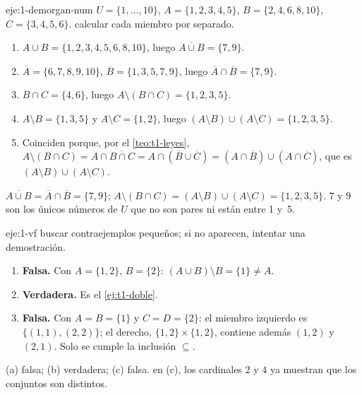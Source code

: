 \begin{solucion}{eje:1-demorgan-num}
\datos $U=\{1,\dots,10\}$, $A=\{1,2,3,4,5\}$, $B=\{2,4,6,8,10\}$, $C=\{3,4,5,6\}$.
\planteamiento calcular cada miembro por separado.
\pasos
\begin{enumerate}[label=\arabic*.]
  \item $A\cup B=\{1,2,3,4,5,6,8,10\}$, luego $\overline{A\cup B}=\{7,9\}$.
  \item $\overline{A}=\{6,7,8,9,10\}$, $\overline{B}=\{1,3,5,7,9\}$, luego $\overline{A}\cap\overline{B}=\{7,9\}$.
  \item $B\cap C=\{4,6\}$, luego $A\setminus(B\cap C)=\{1,2,3,5\}$.
  \item $A\setminus B=\{1,3,5\}$ y $A\setminus C=\{1,2\}$, luego $(A\setminus B)\cup(A\setminus C)=\{1,2,3,5\}$.
  \item Coinciden porque, por el \cref{teo:t1-leyes}, $A\setminus(B\cap C)=A\cap\overline{B\cap C}=A\cap(\overline{B}\cup\overline{C})=(A\cap\overline{B})\cup(A\cap\overline{C})$, que es $(A\setminus B)\cup(A\setminus C)$.
\end{enumerate}
\resultado $\overline{A\cup B}=\overline{A}\cap\overline{B}=\{7,9\}$; $A\setminus(B\cap C)=(A\setminus B)\cup(A\setminus C)=\{1,2,3,5\}$.
\comprobacion $7$ y $9$ son los únicos números de $U$ que no son pares ni están entre 1 y~5.
\end{solucion}

\begin{solucion}{eje:1-vf}
\planteamiento buscar contraejemplos pequeños; si no aparecen, intentar una demostración.
\pasos
\begin{enumerate}[label=(\alph*)]
  \item \textbf{Falsa.} Con $A=\{1,2\}$, $B=\{2\}$: $(A\cup B)\setminus B=\{1\}\neq A$.
  \item \textbf{Verdadera.} Es el \cref{ej:t1-doble}.
  \item \textbf{Falsa.} Con $A=B=\{1\}$ y $C=D=\{2\}$: el miembro izquierdo es $\{(1,1),(2,2)\}$; el derecho, $\{1,2\}\times\{1,2\}$, contiene además $(1,2)$ y $(2,1)$. Solo se cumple la inclusión $\subseteq$.
\end{enumerate}
\resultado (a) falsa; (b) verdadera; (c) falsa.
\comprobacion en (c), los cardinales $2$ y $4$ ya muestran que los conjuntos son distintos.
\end{solucion}

